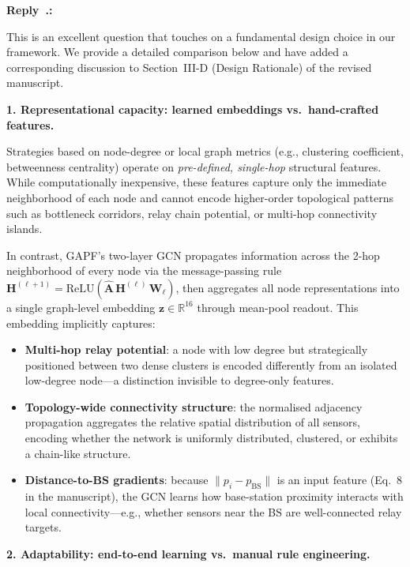 \documentclass[11pt]{article}
\newcounter{reviewer}
\newcounter{replyctr}[reviewer]
\renewcommand{\thereplyctr}{\thereviewer.\arabic{replyctr}}
\newenvironment{reply}
  {\refstepcounter{replyctr}%
   \addtocounter{replyctr}{-1}%
   \medskip\noindent
   \begin{sf}\textbf{Reply~\thereplyctr:}\ }
  {\addtocounter{replyctr}{1}%
   \medskip\end{sf}}
\begin{document}
\begin{reply}
\begin{mdframed}[style=Resp]
This is an excellent question that touches on a fundamental design choice in our framework. We provide a detailed comparison below and have added a corresponding discussion to Section~III-D (Design Rationale) of the revised manuscript.

\medskip
\noindent\textbf{1. Representational capacity: learned embeddings vs.\ hand-crafted features.}

Strategies based on node-degree or local graph metrics (e.g., clustering coefficient, betweenness centrality) operate on \emph{pre-defined, single-hop} structural features. While computationally inexpensive, these features capture only the immediate neighborhood of each node and cannot encode higher-order topological patterns such as bottleneck corridors, relay chain potential, or multi-hop connectivity islands.

In contrast, GAPF's two-layer GCN propagates information across the 2-hop neighborhood of every node via the message-passing rule $\mathbf{H}^{(\ell+1)} = \text{ReLU}(\hat{\mathbf{A}}\,\mathbf{H}^{(\ell)}\,\mathbf{W}_\ell)$, then aggregates all node representations into a single graph-level embedding $\mathbf{z} \in \mathbb{R}^{16}$ through mean-pool readout. This embedding implicitly captures:

\begin{itemize}[nosep]
    \item \textbf{Multi-hop relay potential}: a node with low degree but strategically positioned between two dense clusters is encoded differently from an isolated low-degree node---a distinction invisible to degree-only features.
    \item \textbf{Topology-wide connectivity structure}: the normalised adjacency propagation aggregates the relative spatial distribution of all sensors, encoding whether the network is uniformly distributed, clustered, or exhibits a chain-like structure.
    \item \textbf{Distance-to-BS gradients}: because $\|p_i - p_{\text{BS}}\|$ is an input feature (Eq.~8 in the manuscript), the GCN learns how base-station proximity interacts with local connectivity---e.g., whether sensors near the BS are well-connected relay targets.
\end{itemize}

\medskip
\noindent\textbf{2. Adaptability: end-to-end learning vs.\ manual rule engineering.}


\end{mdframed}
\end{reply}
\end{document}
